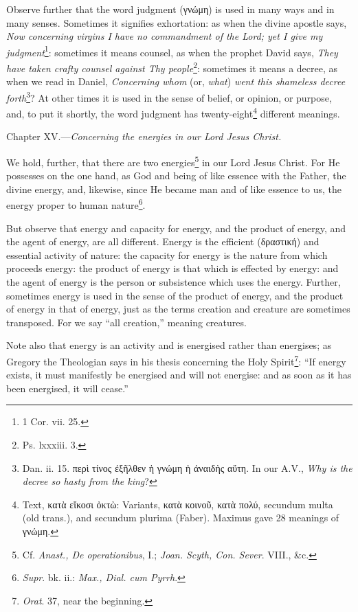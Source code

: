 Observe further that the word judgment (\textgreek{γνώμη}) is used in many ways and in many senses. Sometimes it signifies exhortation: as when the divine apostle says, \emph{Now concerning virgins I have no commandment of the Lord; yet I give my judgment}\footnote{1 Cor. vii. 25.}: sometimes it means counsel, as when the prophet David says, \emph{They have taken crafty counsel against Thy people}\footnote{Ps. lxxxiii. 3.}: sometimes it means a decree, as when we read in Daniel, \emph{Concerning whom }(or, \emph{what}) \emph{went this shameless decree forth}\footnote{Dan. ii. 15. \textgreek{περὶ τίνος ἐξῆλθεν ἡ γνώμη ἡ ἀναιδὴς αὕτη}. In our A.V., \emph{Why is the decree so hasty from the king}?}? At other times it is used in the sense of belief, or opinion, or purpose, and, to put it shortly, the word judgment has twenty-eight\footnote{Text, \textgreek{κατὰ εἴκοσι ὀκτὼ}: Variants, \textgreek{κατὰ κοινοῦ, κατὰ πολύ}, secundum multa (old trans.), and secundum plurima (Faber). Maximus gave 28 meanings of \textgreek{γνώμη}.} different meanings.


Chapter XV.—\emph{Concerning the energies in our Lord Jesus Christ.}

We hold, further, that there are two energies\footnote{Cf. \emph{Anast., De operationibus}, I.; \emph{Joan. Scyth, Con. Sever}. VIII., \&c.} in our Lord Jesus Christ. For He possesses on the one hand, as God and being of like essence with the Father, the divine energy, and, likewise, since He became man and of like essence to us, the energy proper to human nature\footnote{\emph{Supr}. bk. ii.: \emph{Max., Dial. cum Pyrrh}.}.

But observe that energy and capacity for energy, and the product of energy, and the agent of energy, are all different. Energy is the efficient (\textgreek{δραστική}) and essential activity of nature: the capacity for energy is the nature from which proceeds energy: the product of energy is that which is effected by energy: and the agent of energy is the person or subsistence which uses the energy. Further, sometimes energy is used in the sense of the product of energy, and the product of energy in that of energy, just as the terms creation and creature are sometimes transposed. For we say “all creation,” meaning creatures.

Note also that energy is an activity and is energised rather than energises; as Gregory the Theologian says in his thesis concerning the Holy Spirit\footnote{\emph{Orat}. 37, near the beginning.}: “If energy exists, it must manifestly be energised and will not energise: and as soon as it has been energised, it will cease.”

